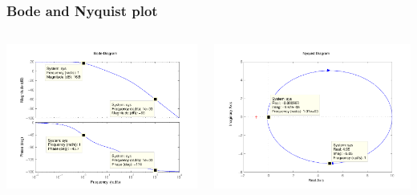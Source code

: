 \begin{frame}
\frametitle{Bode and Nyquist plot}

\begin{columns}
\begin{column}{0.5\textwidth}
\includegraphics[scale = 0.4]{BodeVsNyquist}
\end{column}

\begin{column}{0.5\textwidth}
\includegraphics[scale = 0.4]{NyquistVsBode}
\end{column}
\end{columns}


\end{frame}

